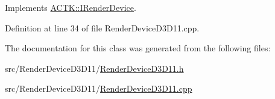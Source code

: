Implements \hyperlink{class_a_c_t_k_1_1_i_render_device_aa3b875c7f072e701e703d97b3fb4db44}{A\-C\-T\-K\-::\-I\-Render\-Device}.



Definition at line 34 of file Render\-Device\-D3\-D11.\-cpp.



The documentation for this class was generated from the following files\-:\begin{DoxyCompactItemize}
\item 
src/\-Render\-Device\-D3\-D11/\hyperlink{_render_device_d3_d11_8h}{Render\-Device\-D3\-D11.\-h}\item 
src/\-Render\-Device\-D3\-D11/\hyperlink{_render_device_d3_d11_8cpp}{Render\-Device\-D3\-D11.\-cpp}\end{DoxyCompactItemize}
